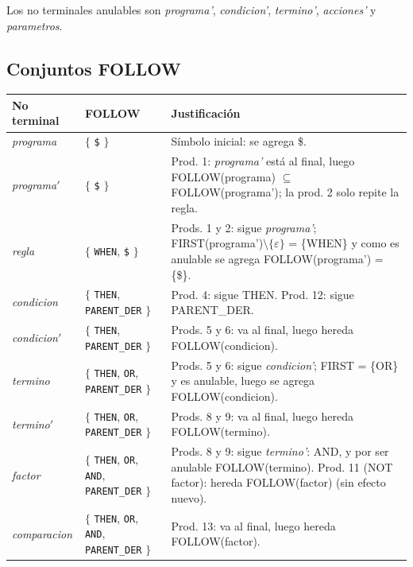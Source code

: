 Los no terminales anulables son \textit{programa'}, \textit{condicion'}, \textit{termino'}, \textit{acciones'} y \textit{parametros}.

\subsection{Conjuntos FOLLOW}
\begin{longtable}{@{}>{\raggedright\arraybackslash}p{2.6cm} >{\raggedright\arraybackslash}p{5.3cm} >{\raggedright\arraybackslash}p{6.9cm}@{}}
\toprule
\textbf{No terminal} & \textbf{FOLLOW} & \textbf{Justificación} \\
\midrule
\endhead
\textit{programa} & $\{$ \texttt{\$} $\}$ & \footnotesize Símbolo inicial: se agrega \$. \\
\textit{programa}$'$ & $\{$ \texttt{\$} $\}$ & \footnotesize Prod. 1: \textit{programa'} está al final, luego FOLLOW(programa) $\subseteq$ FOLLOW(programa'); la prod. 2 solo repite la regla. \\
\textit{regla} & $\{$ \texttt{WHEN}, \texttt{\$} $\}$ & \footnotesize Prods. 1 y 2: sigue \textit{programa'}; FIRST(programa')$\setminus\{\varepsilon\}$ = \{WHEN\} y como es anulable se agrega FOLLOW(programa') = \{\$\}. \\
\textit{condicion} & $\{$ \texttt{THEN}, \texttt{PARENT\_DER} $\}$ & \footnotesize Prod. 4: sigue THEN. Prod. 12: sigue PARENT\_DER. \\
\textit{condicion}$'$ & $\{$ \texttt{THEN}, \texttt{PARENT\_DER} $\}$ & \footnotesize Prods. 5 y 6: va al final, luego hereda FOLLOW(condicion). \\
\textit{termino} & $\{$ \texttt{THEN}, \texttt{OR}, \texttt{PARENT\_DER} $\}$ & \footnotesize Prods. 5 y 6: sigue \textit{condicion'}; FIRST = \{OR\} y es anulable, luego se agrega FOLLOW(condicion). \\
\textit{termino}$'$ & $\{$ \texttt{THEN}, \texttt{OR}, \texttt{PARENT\_DER} $\}$ & \footnotesize Prods. 8 y 9: va al final, luego hereda FOLLOW(termino). \\
\textit{factor} & $\{$ \texttt{THEN}, \texttt{OR}, \texttt{AND}, \texttt{PARENT\_DER} $\}$ & \footnotesize Prods. 8 y 9: sigue \textit{termino'}: AND, y por ser anulable FOLLOW(termino). Prod. 11 (NOT factor): hereda FOLLOW(factor) (sin efecto nuevo). \\
\textit{comparacion} & $\{$ \texttt{THEN}, \texttt{OR}, \texttt{AND}, \texttt{PARENT\_DER} $\}$ & \footnotesize Prod. 13: va al final, luego hereda FOLLOW(factor). \\

\end{longtable}
